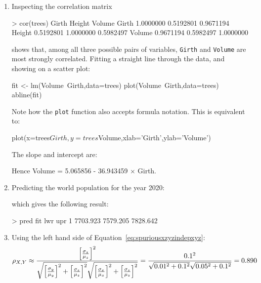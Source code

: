 \begin{enumerate}

\item Inspecting the correlation matrix
  
\begin{script}
> cor(trees)
           Girth    Height    Volume
Girth  1.0000000 0.5192801 0.9671194
Height 0.5192801 1.0000000 0.5982497
Volume 0.9671194 0.5982497 1.0000000
\end{script}

\noindent shows that, among all three possible pairs of variables,
\texttt{Girth} and \texttt{Volume} are most strongly correlated.
Fitting a straight line through the data, and showing on a scatter
plot:

\begin{script}
fit <- lm(Volume~Girth,data=trees)
plot(Volume~Girth,data=trees)
abline(fit)
\end{script}

Note how the \texttt{plot} function also accepts formula
notation. This is equivalent to:

\begin{script}[firstnumber=2]
plot(x=trees$Girth,y=trees$Volume,xlab='Girth',ylab='Volume')
\end{script}
  
The slope and intercept are:


Hence Volume = 5.065856 - 36.943459 $\times$ Girth.

\item Predicting the world population for the year 2020:


\noindent which gives the following result:

\begin{console}
> pred
       fit      lwr      upr
1 7703.923 7579.205 7828.642
\end{console}

\item Using the left hand side of
  Equation~\ref{eq:spuriousxzyzindepxyz}:
  \[
  \noindent \rho_{X,Y} \approx
  \frac{
    \left[\frac{\sigma_z}{\mu_z}\right]^2
  }{
    \sqrt{\left[\frac{\sigma_y}{\mu_y}\right]^2 +
      \left[\frac{\sigma_z}{\mu_z}\right]^2}
    \sqrt{\left[\frac{\sigma_x}{\mu_x}\right]^2 +
      \left[\frac{\sigma_z}{\mu_z}\right]^2}
  }
  =
  \frac{
    0.1^2
  }{
    \sqrt{0.01^2 + 0.1^2}\sqrt{0.05^2 + 0.1^2}
  }
  = 0.890
  \]


\end{enumerate}
